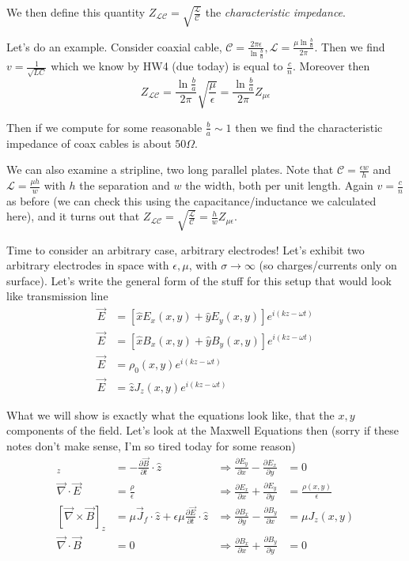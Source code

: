 \documentclass[10pt]{report}
\newcommand{\pd}[2]{\frac{\partial #1}{\partial#2}}
\begin{document}
We then define this quantity $Z_{\mathcal{LC}} = \sqrt{\frac{\mathcal{L}}{\mathcal{C}}}$ the \emph{characteristic impedance}.

Let's do an example. Consider coaxial cable, $\mathcal{C} = \frac{2\pi \epsilon}{\ln \frac{b}{a}}, \mathcal{L} = \frac{\mu \ln \frac{b}{a}}{2\pi}$. Then we find $v = \frac{1}{\sqrt{LC}}$ which we know by HW4 (due today) is equal to $\frac{c}{n}$. Moreover then 
\begin{equation}
    Z_{\mathcal{LC}} = \frac{\ln \frac{b}{a}}{2\pi}\sqrt{\frac{\mu}{\epsilon}} = \frac{\ln \frac{b}{a}}{2\pi}Z_{\mu \epsilon}
\end{equation}

Then if we compute for some reasonable $\frac{b}{a}\sim1$ then we find the characteristic impedance of coax cables is about $50\Omega$. 

We can also examine a stripline, two long parallel plates. Note that $\mathcal{C} = \frac{\epsilon w}{h}$ and $\mathcal{L} = \frac{\mu h}{w}$ with $h$ the separation and $w$ the width, both per unit length. Again $v = \frac{c}{n}$ as before (we can check this using the capacitance/inductance we calculated here), and it turns out that $Z_{\mathcal{LC}} = \sqrt{\frac{\mathcal{L}}{\mathcal{C}}} = \frac{h}{w}Z_{\mu \epsilon}$. 

Time to consider an arbitrary case, arbitrary electrodes! Let's exhibit two arbitrary electrodes in space with $\epsilon,\mu$, with $\sigma \to \infty$ (so charges/currents only on surface). Let's write the general form of the stuff for this setup that would look like transmission line
\begin{align}
    \vec{E} &= \left[ \hat{x}E_x(x,y) + \hat{y}E_{y}(x,y) \right]e^{i(kz - \omega t)}\\
    \vec{E} &= \left[ \hat{x}B_x(x,y) + \hat{y}B_{y}(x,y) \right]e^{i(kz - \omega t)}\\
    \vec{E} &= \rho_0(x,y)e^{i(kz - \omega t)}\\
    \vec{E} &= \hat{z}J_z(x,y)e^{i(kz - \omega t)}
\end{align}

What we will show is exactly what the equations look like, that the $x,y$ components of the field. Let's look at the Maxwell Equations then (sorry if these notes don't make sense, I'm so tired today for some reason)
\begin{align}
    [\vec{\nabla} \times \vec{E}]_z &= -\pd{\vec{B}}{t} \cdot \hat{z} &\Rightarrow \pd{E_y}{x} - \pd{E_x}{y} &= 0\\
    \vec{\nabla} \cdot \vec{E} &= \frac{\rho}{\epsilon} &\Rightarrow \pd{E_x}{x} + \pd{E_y}{y} &= \frac{\rho(x,y)}{\epsilon}\\
    [\vec{\nabla} \times \vec{B}]_z &= \mu \vec{J}_f \cdot \hat{z} + \epsilon \mu \pd{\vec{E}}{t}\cdot \hat{z} &\Rightarrow \pd{B_x}{y} - \pd{B_y}{x} &= \mu J_z (x,y)\\
    \vec{\nabla} \cdot \vec{B} &= 0 &\Rightarrow \pd{B_x}{x} + \pd{B_y}{y} &= 0
\end{align}
\end{document}
